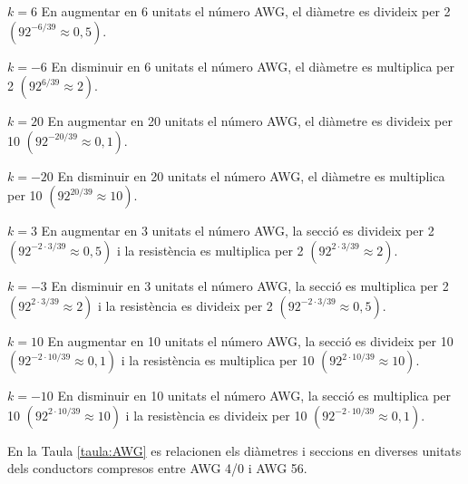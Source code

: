 \begin{list}{}
   {\setlength{\labelwidth}{15mm} \setlength{\leftmargin}{17mm} \setlength{\labelsep}{2mm}}

   \item[$k=6$\hfill] En augmentar en 6  unitats el n\'{u}mero AWG, el di\`{a}metre es divideix per 2
                 $(92^{-6/39}\approx 0{,}5)$.

   \item[$k=-6$\hfill] En disminuir en 6 unitats el n\'{u}mero AWG, el di\`{a}metre es multiplica per 2
                 $(92^{6/39}\approx 2)$.

   \item[$k=20$\hfill] En augmentar en 20  unitats el n\'{u}mero AWG, el di\`{a}metre es divideix per 10
                 $(92^{-20/39}\approx 0{,}1)$.

   \item[$k=-20$\hfill] En disminuir en 20 unitats el n\'{u}mero AWG, el di\`{a}metre es multiplica per 10
                 $(92^{20/39}\approx 10)$.

   \item[$k=3$\hfill] En augmentar en 3 unitats el n\'{u}mero AWG, la secci\'{o} es divideix per 2
                 $(92^{-2\cdot3/39}\approx 0{,}5)$ i la resist\`{e}ncia es multiplica per 2
                 $(92^{2\cdot3/39}\approx 2)$.

   \item[$k=-3$\hfill] En disminuir en 3 unitats el n\'{u}mero AWG, la secci\'{o} es multiplica per 2
                  $(92^{2\cdot3/39}\approx 2)$ i la resist\`{e}ncia es divideix per 2
                  $(92^{-2\cdot3/39}\approx 0{,}5)$.

   \item[$k=10$\hfill] En augmentar en 10 unitats el n\'{u}mero AWG, la secci\'{o} es divideix per 10
                 $(92^{-2\cdot10/39}\approx 0{,}1)$ i la resist\`{e}ncia es multiplica per 10
                 $(92^{2\cdot10/39}\approx 10)$.

   \item[$k=-10$\hfill] En disminuir en 10 unitats el n\'{u}mero AWG, la secci\'{o} es multiplica per 10
                  $(92^{2\cdot10/39}\approx 10)$ i la resist\`{e}ncia es divideix per 10
                  $(92^{-2\cdot10/39}\approx 0{,}1)$.
\end{list}

En la Taula \vref{taula:AWG} es relacionen els di\`{a}metres i seccions en diverses unitats dels conductors compresos entre AWG 4/0 i AWG 56.



